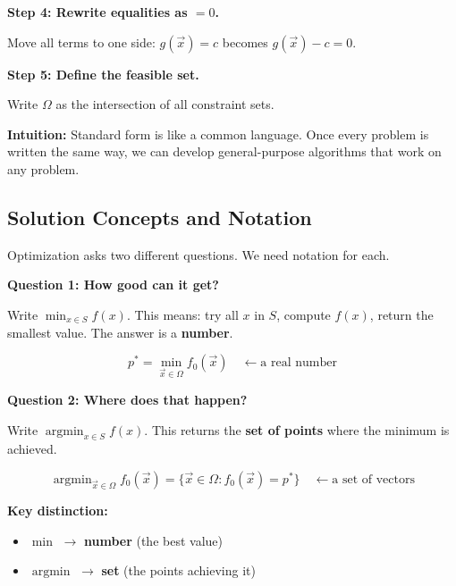\documentclass[10pt, twocolumn]{article}
\theoremstyle{definition}
\theoremstyle{plain}
\DeclareMathOperator{\argmin}{argmin}
\begin{document}
\textbf{Step 4: Rewrite equalities as $= 0$.}

Move all terms to one side: $g(\vec{x}) = c$ becomes $g(\vec{x}) - c = 0$.

\textbf{Step 5: Define the feasible set.}

Write $\Omega$ as the intersection of all constraint sets.

\begin{tcolorbox}[colframe=black!50]
\textbf{Intuition:} Standard form is like a common language. Once every problem is written the same way, we can develop general-purpose algorithms that work on any problem.
\end{tcolorbox}

\subsection{Solution Concepts and Notation}

Optimization asks two different questions. We need notation for each.

\textbf{Question 1: How good can it get?}

Write $\min_{x \in S} f(x)$. This means: try all $x$ in $S$, compute $f(x)$, return the smallest value. The answer is a \textbf{number}.

\begin{result}
\[
    p^* = \min_{\vec{x} \in \Omega} f_0(\vec{x}) \quad \leftarrow \text{a real number}
\]
\end{result}

\textbf{Question 2: Where does that happen?}

Write $\argmin_{x \in S} f(x)$. This returns the \textbf{set of points} where the minimum is achieved.

\begin{result}
\[
    \argmin_{\vec{x} \in \Omega} f_0(\vec{x}) = \{\vec{x} \in \Omega : f_0(\vec{x}) = p^*\} \quad \leftarrow \text{a set of vectors}
\]
\end{result}

\begin{tcolorbox}[colframe=black!50]
\textbf{Key distinction:}
\begin{itemize}
    \item $\min$ $\to$ \textbf{number} (the best value)
    \item $\argmin$ $\to$ \textbf{set} (the points achieving it)
\end{itemize}
\end{tcolorbox}
\end{document}
